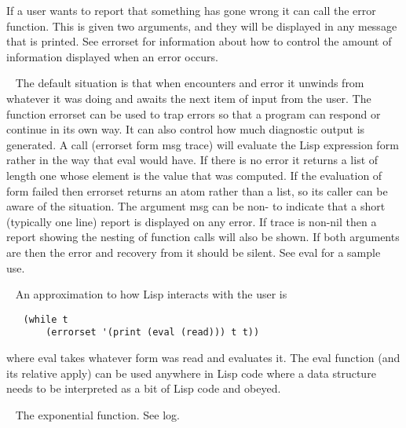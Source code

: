 \begin{description}
If a user wants to report that something has gone wrong it can call the
{\tx error} function. This is given two arguments, and they will be displayed
in any message that is printed. See {\tx errorset} for information about how
to control the amount of information displayed when an error occurs.
\item[{\tx errorset~~~~~} \hspace{1cm} {\em function 3 args}]~\newline
The default situation is that when \vsl{} encounters and error it unwinds
from whatever it was doing and awaits the next item of input from the user.
The function {\tx errorset} can be used to trap errors so that a program can
respond or continue in its own way. It can also control how much diagnostic
output is generated. A call {\tx (errorset form msg trace)} will evaluate
the Lisp expression {\tx form} rather in the way that {\tx eval} would have.
If there is no error it returns a list of length one whose element is the
value that was computed. If the evaluation of {\tx form} failed then
{\tx errorset} returns an atom rather than a list, so its caller can be
aware of the situation. The argument {\tx msg} can be non-\nil{} to indicate
that a short (typically one line) report is displayed on any error. If
{\tx trace} is non-nil then a report showing the nesting of function calls
will also be shown. If both arguments are \nil{} then the error and recovery
from it should be silent. See {\tx eval} for a sample use.
\item[{\tx eval~~~~~~~~~} \hspace{1cm} {\em function 1 arg}]~\newline
An approximation to how Lisp interacts with the user is
{\small\begin{verbatim}
   (while t
       (errorset '(print (eval (read))) t t))
\end{verbatim}}
\noindent where {\tx eval} takes whatever form was read and evaluates it. The
{\tx eval} function (and its relative {\tx apply}) can be used anywhere in Lisp
code where a data structure needs to be interpreted as a bit of Lisp code and
obeyed.
\item[{\tx exp~~~~~~~~~~} \hspace{1cm} {\em special form}]~\newline
The exponential function. See {\tx log}.
\item[{\tx expand~~~~~~~} \hspace{1cm} {\em function 2 args}]~\newline

\end{description}
